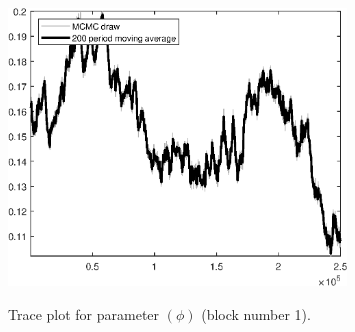 \begin{figure}[H]
\centering
  \includegraphics[width=0.8\textwidth]{BRS_comovement/graphs/TracePlot_phi_blck_1}\\
    \caption{Trace plot for parameter $(\phi)$ (block number 1).}
\end{figure}
